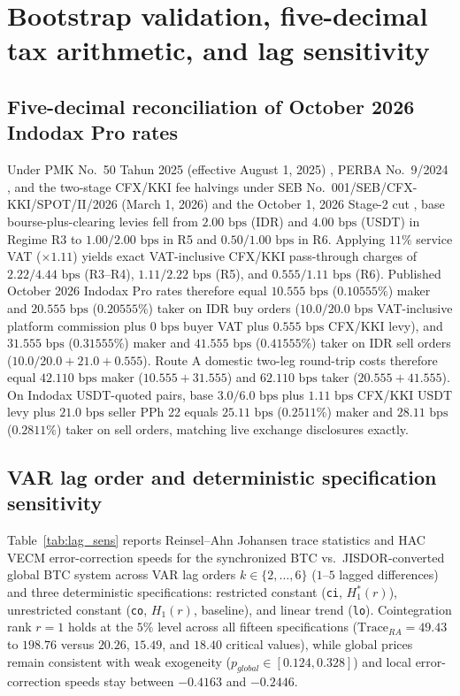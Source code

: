\section{Bootstrap validation, five-decimal tax arithmetic, and lag sensitivity}
\label{app:details}

\subsection{Five-decimal reconciliation of October 2026 Indodax Pro rates}
Under PMK No.\ 50 Tahun 2025 (effective August 1, 2025) \citep{pmk50_2025}, PERBA No.\ 9/2024 \citep{perba9_2024}, and the two-stage CFX/KKI fee halvings under SEB No.\ 001/SEB/CFX-KKI/SPOT/II/2026 (March 1, 2026) and the October 1, 2026 Stage-2 cut \citep{cfx_seb001_2026}, base bourse-plus-clearing levies fell from $2.00\text{ bps}$ (IDR) and $4.00\text{ bps}$ (USDT) in Regime R3 to $1.00/2.00\text{ bps}$ in R5 and $0.50/1.00\text{ bps}$ in R6. Applying $11\%$ service VAT ($\times 1.11$) yields exact VAT-inclusive CFX/KKI pass-through charges of $2.22/4.44\text{ bps}$ (R3--R4), $1.11/2.22\text{ bps}$ (R5), and $0.555/1.11\text{ bps}$ (R6). Published October 2026 Indodax Pro rates \citep{indodax_fees_2026} therefore equal $10.555\text{ bps}$ ($0.10555\%$) maker and $20.555\text{ bps}$ ($0.20555\%$) taker on IDR buy orders ($10.0/20.0\text{ bps}$ VAT-inclusive platform commission plus $0\text{ bps}$ buyer VAT plus $0.555\text{ bps}$ CFX/KKI levy), and $31.555\text{ bps}$ ($0.31555\%$) maker and $41.555\text{ bps}$ ($0.41555\%$) taker on IDR sell orders ($10.0/20.0 + 21.0 + 0.555$). Route A domestic two-leg round-trip costs therefore equal $42.110\text{ bps}$ maker ($10.555 + 31.555$) and $62.110\text{ bps}$ taker ($20.555 + 41.555$). On Indodax USDT-quoted pairs, base $3.0/6.0\text{ bps}$ plus $1.11\text{ bps}$ CFX/KKI USDT levy plus $21.0\text{ bps}$ seller PPh 22 equals $25.11\text{ bps}$ ($0.2511\%$) maker and $28.11\text{ bps}$ ($0.2811\%$) taker on sell orders, matching live exchange disclosures exactly.

\subsection{VAR lag order and deterministic specification sensitivity}
Table~\ref{tab:lag_sens} reports Reinsel--Ahn Johansen trace statistics and HAC VECM error-correction speeds for the synchronized BTC vs.\ JISDOR-converted global BTC system across VAR lag orders $k \in \{2,\dots,6\}$ ($1$--$5$ lagged differences) and three deterministic specifications: restricted constant (\texttt{ci}, $H_1^*(r)$), unrestricted constant (\texttt{co}, $H_1(r)$, baseline), and linear trend (\texttt{lo}). Cointegration rank $r=1$ holds at the $5\%$ level across all fifteen specifications ($\text{Trace}_{RA} = 49.43$ to $198.76$ versus $20.26$, $15.49$, and $18.40$ critical values), while global prices remain consistent with weak exogeneity ($p_{global} \in [0.124, 0.328]$) and local error-correction speeds stay between $-0.4163$ and $-0.2446$.

